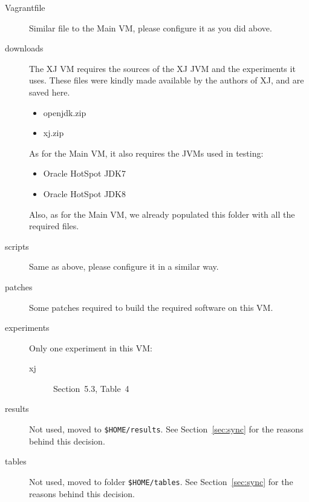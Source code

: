 \documentclass[12pt]{article}
\newcommand{\vm}[1]{\colorbox{green!20}{\texttt{\color{black}#1}}}
\begin{document}
\begin{description}

    \item[Vagrantfile] Similar file to the Main VM, please configure it as you
        did above.

    \item[downloads] The XJ VM requires the sources of the XJ JVM and the
        experiments it uses.  These files were kindly made available by the
        authors of XJ, and are saved here.

        \begin{itemize}

            \item openjdk.zip

            \item xj.zip

        \end{itemize}

        As for the Main VM, it also requires the JVMs used in testing:

        \begin{itemize}

            \item Oracle HotSpot JDK7

            \item Oracle HotSpot JDK8

        \end{itemize}

        Also, as for the Main VM, we already populated this folder with all the
        required files.

    \item[scripts]  Same as above, please configure it in a similar way.

    \item[patches]  Some patches required to build the required software on this VM.

    \item[experiments]  Only one experiment in this VM:

        \begin{description}

            \item[xj] Section~5.3, Table~4

        \end{description}

    \item[results]  Not used, moved to \vm{\$HOME/results}.  See
        Section~\ref{sec:sync} for the reasons behind this decision.


    \item[tables]  Not used, moved to folder \vm{\$HOME/tables}.  See
        Section~\ref{sec:sync} for the reasons behind this decision.

\end{description}
\end{document}
